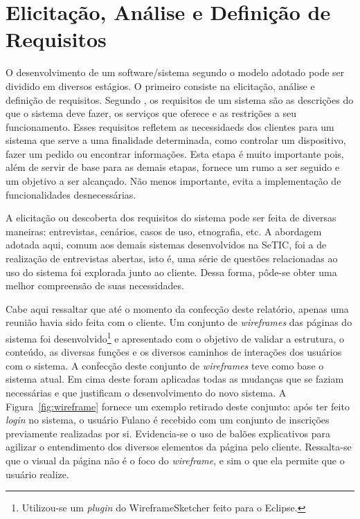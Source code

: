 \documentclass[
  10.5pt,				  %
	openright,			%
	twoside,			  %
  a5paper,
  chapter=TITLE,	%
	section=TITLE,	%
  hyphens,        %
	english,        %
	brazil          %
]{abntex2}
\begin{document}
\section{Elicitação, Análise e Definição de Requisitos}

O desenvolvimento de um software/sistema segundo o modelo adotado pode ser dividido em diversos estágios. O primeiro consiste na elicitação, análise e definição de requisitos. Segundo \cite{sommerville2011}, os requisitos de um sistema são as descrições do que o sistema deve fazer, os serviços que oferece e as restrições a seu funcionamento. Esses requisitos refletem as necessidaeds dos clientes para um sistema que serve a uma finalidade determinada, como controlar um dispositivo, fazer um pedido ou encontrar informações. Esta etapa é muito importante pois, além de servir de base para as demais etapas, fornece um rumo a ser seguido e um objetivo a ser alcançado. Não menos importante, evita a implementação de funcionalidades desnecessárias.

A elicitação ou descoberta dos requisitos do sistema pode ser feita de diversas maneiras: entrevistas, cenários, casos de uso, etnografia, etc. A abordagem adotada aqui, comum aos demais sistemas desenvolvidos na SeTIC, foi a de realização de entrevistas abertas, isto é, uma série de questões relacionadas ao uso do sistema foi explorada junto ao cliente. Dessa forma, pôde-se obter uma melhor compreensão de suas necessidades.

Cabe aqui ressaltar que até o momento da confecção deste relatório, apenas uma reunião havia sido feita com o cliente. Um conjunto de \emph{wireframes} das páginas do sistema foi desenvolvido\footnote{Utilizou-se um \emph{plugin} do WireframeSketcher feito para o Eclipse.} e apresentado com o objetivo de validar a estrutura, o conteúdo, as diversas funções e os diversos caminhos de interações dos usuários com o sistema. A confecção deste conjunto de \emph{wireframes} teve como base o sistema atual. Em cima deste foram aplicadas todas as mudanças que se faziam necessárias e que justificam o desenvolvimento do novo sistema. A Figura~\ref{fig:wireframe} fornece um exemplo retirado deste conjunto: após ter feito \emph{login} no sistema, o usuário Fulano é recebido com um conjunto de inscrições previamente realizadas por si. Evidencia-se o uso de balões explicativos para agilizar o entendimento dos diversos elementos da página pelo cliente. Ressalta-se que o visual da página não é o foco do \emph{wireframe}, e sim o que ela permite que o usuário realize.
\end{document}

